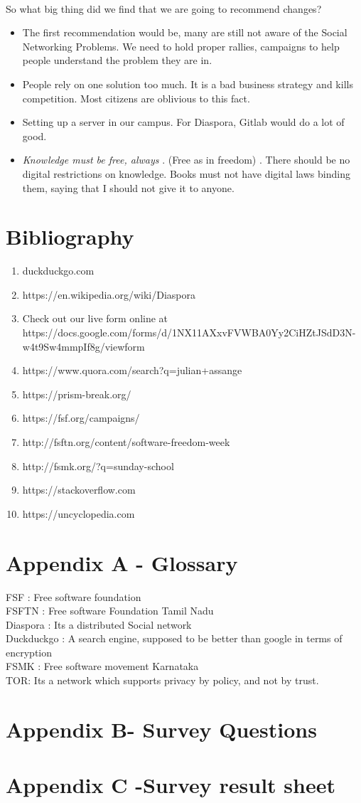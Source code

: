\documentclass[11pt]{book}
\begin{document}
\\So what big thing did we find that we are going to recommend changes? 
\begin{itemize}
	\item The first recommendation would be, many are still not aware of the Social Networking Problems.
		We need to hold proper rallies, campaigns to help people understand the problem they are in.
	\item People rely on one solution too much. It is a bad business strategy and kills competition. Most 
		citizens are oblivious to this fact. 
	\item Setting up a server in our campus. For Diaspora, Gitlab would do a lot of good.
	\item \emph{Knowledge must be free, always} . (Free as in freedom) . There should be no digital restrictions on knowledge. 
		Books must not have digital laws binding them, saying that I should not give it to anyone. 

\end{itemize}
\newpage
\chapter{Bibliography}
\begin{enumerate}
	\item duckduckgo.com
	\item https://en.wikipedia.org/wiki/Diaspora
	\item Check out our live form online at https://docs.google.com/forms/d/1NX11AXxvFVWBA0Yy2CiHZtJSdD3N-w4t9Sw4mmpIf8g/viewform
	\item https://www.quora.com/search?q=julian+assange
	\item https://prism-break.org/
	\item https://fsf.org/campaigns/
	\item http://fsftn.org/content/software-freedom-week
	\item http://fsmk.org/?q=sunday-school
	\item https://stackoverflow.com
	\item https://uncyclopedia.com
\end{enumerate}
\newpage
\chapter{Appendix A - Glossary}
FSF : Free software foundation\\
FSFTN : Free software Foundation Tamil Nadu\\
Diaspora : Its a distributed Social network\\
Duckduckgo : A search engine, supposed to be better than google in terms of encryption\\
FSMK : Free software movement Karnataka\\
TOR: Its a network which supports privacy by policy, and not by trust.\\

\newpage
\chapter{Appendix B- Survey Questions}
\newpage
\chapter{Appendix C -Survey result sheet}
\newpage
\renewcommand{\cftchapdotsep}{\cftdotsep}
\end{document}
